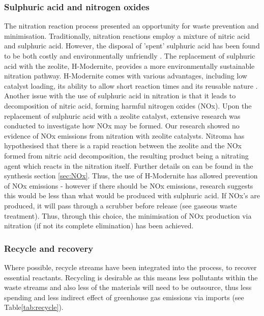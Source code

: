 \subsubsection{Sulphuric acid and nitrogen oxides}
The nitration reaction process presented an opportunity for waste prevention and minimisation. Traditionally, nitration reactions employ a mixture of nitric acid and sulphuric acid. However, the disposal of 'spent' sulphuric acid has been found to be both costly and environmentally unfriendly \cite{smith_superior_1996}. The replacement of sulphuric acid with the zeolite, H-Modernite, provides a more environmentally sustainable nitration pathway. H-Modernite comes with various advantages, including low catalyst loading, its ability to allow short reaction times and its reusable nature \cite{smith_superior_1996}. Another issue with the use of sulphuric acid in nitration is that it leads to decomposition of nitric acid, forming harmful nitrogen oxides (NOx). Upon the replacement of sulphuric acid with a zeolite catalyst, extensive research was conducted to investigate how NOx may be formed. Our research showed no evidence of NOx emissions from nitration with zeolite catalysts. Nitroma has hypothesised that there is a rapid reaction between the zeolite and the NOx formed from nitric acid decomposition, the resulting product being a nitrating agent which reacts in the nitration itself. Further details on can be found in the synthesis section \ref{sec:NOx}. Thus, the use of H-Modernite has allowed prevention of NOx emissions - however if there should be NOx emissions, research suggests this would be less than what would be produced with sulphuric acid. If NOx's are produced, it will pass through a scrubber before release (see gaseous waste treatment). Thus, through this choice, the minimisation of NOx production via nitration (if not its complete elimination) has been achieved. 

\subsubsection{Recycle and recovery}

Where possible, recycle streams have been integrated into the process, to recover essential reactants. Recycling is desirable as this means less pollutants within the waste streams and also less of the materials will need to be outsource, thus less spending and less indirect effect of greenhouse gas emissions via imports (see Table\ref{tab:recycle}).


